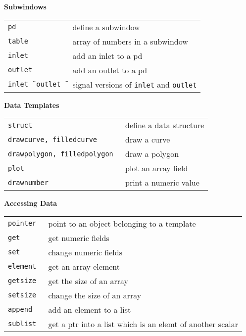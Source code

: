 \documentclass[a4paper, landscape, 10pt]{article}
\newcommand{\refcardtitle}[1]{
  \begin{center}
    \textbf{\small{#1}}
  \end{center}
}
\begin{document}
\begin{multicols}{3}
  \refcardtitle{Subwindows}
  \begin{tabularx}{9cm}{>{\tt}l X}
    pd & define a subwindow \\
    table & array of numbers in a subwindow \\
    inlet & add an inlet to a pd \\
    outlet & add an outlet to a pd \\
    inlet\~\, outlet\~\ & signal versions of \texttt{inlet} and \texttt{outlet} \\
  \end{tabularx}

  \refcardtitle{Data Templates}
  \begin{tabularx}{9cm}{>{\tt}l X}
    struct & define a data structure \\
    drawcurve, filledcurve & draw a curve \\
    drawpolygon, filledpolygon & draw a polygon \\
    plot & plot an array field \\
    drawnumber & print a numeric value \\
  \end{tabularx}

  \refcardtitle{Accessing Data}
  \begin{tabularx}{9cm}{>{\tt}l X}
    pointer & point to an object belonging to a template \\
    get & get numeric fields \\
    set & change numeric fields \\
    element & get an array element \\
    getsize & get the size of an array \\
    setsize & change the size of an array \\
    append & add an element to a list \\
    sublist & get a ptr into a list which is an elemt of another scalar \\
  \end{tabularx}

\end{multicols}
\end{document}
